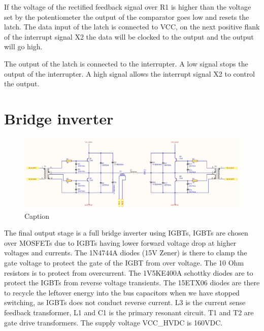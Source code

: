 If the voltage of the rectified feedback signal over R1 is higher than the voltage set by the potentiometer the output of the comparator goes low and resets the latch. The data input of the latch is connected to VCC, on the next positive flank of the interrupt signal X2 the data will be clocked to the output and the output will go high.

The output of the latch is connected to the interrupter. A low signal stops the output of the interrupter. A high signal allows the interrupt signal X2 to control the output.



\section{Bridge inverter}

\begin{figure}
    \centering
    \includegraphics[width=\textwidth]{Skjema/TK531_Utgangstrinn_r.pdf}
    \caption{Caption}
    \label{fig:tk531}
\end{figure}

The final output stage is a full bridge inverter using IGBTs, IGBTs are chosen over MOSFETs due to IGBTs having lower forward voltage drop at higher voltages and currents. The 1N4744A diodes (15V Zener) is there to clamp the gate voltage to protect the gate of the IGBT from over voltage. The 10 Ohm resistors is to protect from overcurrent. The 1V5KE400A schottky diodes are to protect the IGBTs from reverse voltage transients. The 15ETX06 diodes are there to recycle the leftover energy into the bus capacitors when we have stopped switching, as IGBTs does not conduct reverse current. L3 is the current sense feedback transformer, L1 and C1 is the primary resonant circuit. T1 and T2 are gate drive transformers. The supply voltage VCC\_HVDC is 160VDC.

